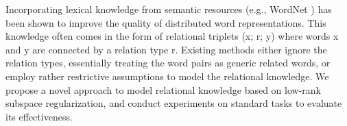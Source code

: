 Incorporating lexical knowledge from semantic resources (e.g., WordNet ) has been shown to improve the quality of distributed word representations. This knowledge often comes in the form of relational triplets (x; r; y) where words x and y are connected by a relation type r. Existing methods either ignore the relation types, essentially treating the word pairs as generic related words, or employ rather restrictive assumptions to model the relational knowledge. We propose a novel approach to model relational knowledge based on low-rank subspace regularization, and conduct experiments on standard tasks to evaluate its effectiveness.
